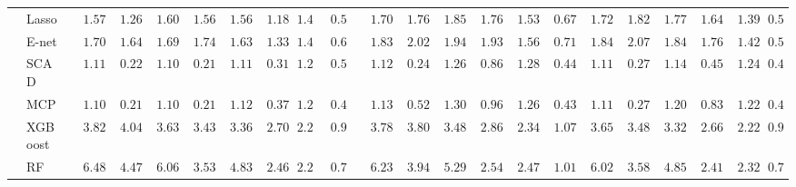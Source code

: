 \begin{tabular}{ll|ll|llllll|llllll|llllll}
 & Lasso  & $\phantom{00}1.57$ & $\phantom{00}1.26$ & $\phantom{00}1.60$ & $\phantom{00}1.56$ & $\phantom{00}1.56$ & $\phantom{00}1.18$ & $\phantom{0}1.41$ & $\phantom{0}0.59$ & $\phantom{00}1.70$ & $\phantom{00}1.76$ & $\phantom{00}1.85$ & $\phantom{00}1.76$ & $\phantom{00}1.53$ & $\phantom{00}0.67$ & $\phantom{00}1.72$ & $\phantom{00}1.82$ & $\phantom{00}1.77$ & $\phantom{00}1.64$ & $\phantom{00}1.39$ & $\phantom{0}0.50$ \\
 & E-net  & $\phantom{00}1.70$ & $\phantom{00}1.64$ & $\phantom{00}1.69$ & $\phantom{00}1.74$ & $\phantom{00}1.63$ & $\phantom{00}1.33$ & $\phantom{0}1.43$ & $\phantom{0}0.60$ & $\phantom{00}1.83$ & $\phantom{00}2.02$ & $\phantom{00}1.94$ & $\phantom{00}1.93$ & $\phantom{00}1.56$ & $\phantom{00}0.71$ & $\phantom{00}1.84$ & $\phantom{00}2.07$ & $\phantom{00}1.84$ & $\phantom{00}1.76$ & $\phantom{00}1.42$ & $\phantom{0}0.53$ \\
 & SCAD  & $\phantom{00}1.11$ & $\phantom{00}0.22$ & $\phantom{00}1.10$ & $\phantom{00}0.21$ & $\phantom{00}1.11$ & $\phantom{00}0.31$ & $\phantom{0}1.25$ & $\phantom{0}0.51$ & $\phantom{00}1.12$ & $\phantom{00}0.24$ & $\phantom{00}1.26$ & $\phantom{00}0.86$ & $\phantom{00}1.28$ & $\phantom{00}0.44$ & $\phantom{00}1.11$ & $\phantom{00}0.27$ & $\phantom{00}1.14$ & $\phantom{00}0.45$ & $\phantom{00}1.24$ & $\phantom{0}0.43$ \\
 & MCP  & $\phantom{00}1.10$ & $\phantom{00}0.21$ & $\phantom{00}1.10$ & $\phantom{00}0.21$ & $\phantom{00}1.12$ & $\phantom{00}0.37$ & $\phantom{0}1.22$ & $\phantom{0}0.47$ & $\phantom{00}1.13$ & $\phantom{00}0.52$ & $\phantom{00}1.30$ & $\phantom{00}0.96$ & $\phantom{00}1.26$ & $\phantom{00}0.43$ & $\phantom{00}1.11$ & $\phantom{00}0.27$ & $\phantom{00}1.20$ & $\phantom{00}0.83$ & $\phantom{00}1.22$ & $\phantom{0}0.42$ \\
 & XGBoost  & $\phantom{00}3.82$ & $\phantom{00}4.04$ & $\phantom{00}3.63$ & $\phantom{00}3.43$ & $\phantom{00}3.36$ & $\phantom{00}2.70$ & $\phantom{0}2.20$ & $\phantom{0}0.92$ & $\phantom{00}3.78$ & $\phantom{00}3.80$ & $\phantom{00}3.48$ & $\phantom{00}2.86$ & $\phantom{00}2.34$ & $\phantom{00}1.07$ & $\phantom{00}3.65$ & $\phantom{00}3.48$ & $\phantom{00}3.32$ & $\phantom{00}2.66$ & $\phantom{00}2.22$ & $\phantom{0}0.93$ \\
 & RF  & $\phantom{00}6.48$ & $\phantom{00}4.47$ & $\phantom{00}6.06$ & $\phantom{00}3.53$ & $\phantom{00}4.83$ & $\phantom{00}2.46$ & $\phantom{0}2.24$ & $\phantom{0}0.70$ & $\phantom{00}6.23$ & $\phantom{00}3.94$ & $\phantom{00}5.29$ & $\phantom{00}2.54$ & $\phantom{00}2.47$ & $\phantom{00}1.01$ & $\phantom{00}6.02$ & $\phantom{00}3.58$ & $\phantom{00}4.85$ & $\phantom{00}2.41$ & $\phantom{00}2.32$ & $\phantom{0}0.75$ \\

\end{tabular}
